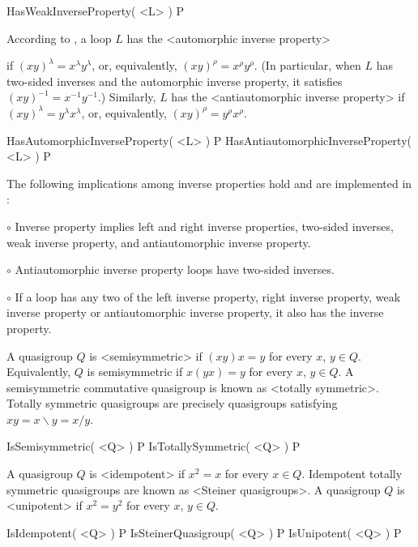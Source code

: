 \>HasWeakInverseProperty( <L> ) P

According to \cite{Ar}, a loop $L$ has the <automorphic inverse property>
%
%

if $(xy)^\lambda = x^\lambda y^\lambda$, or, equivalently, $(xy)^\rho = x^\rho
y^\rho$. (In particular, when $L$ has two-sided inverses and the automorphic
inverse property, it satisfies $(xy)^{-1}=x^{-1}y^{-1}$.) Similarly, $L$ has
the <antiautomorphic inverse property>
%
%
 if $(xy)^\lambda=y^\lambda
x^\lambda$, or, equivalently, $(xy)^\rho = y^\rho x^\rho$.

\>HasAutomorphicInverseProperty( <L> ) P
\>HasAntiautomorphicInverseProperty( <L> ) P

The following implications among inverse properties hold and are
implemented in {\LOOPS}:
\beginlist%
\item{$\circ$}
    Inverse property implies left and right inverse properties,
    two-sided inverses, weak inverse property, and antiautomorphic
    inverse property.
\item{$\circ$}
    Antiautomorphic inverse property loops have two-sided inverses.
\item{$\circ$}
    If a loop has any two of the left inverse property, right inverse property,
    weak inverse property or antiautomorphic inverse property, it also has
    the inverse property.
\endlist


A quasigroup $Q$ is <semisymmetric> if
$(xy)x=y$ for every $x$, $y\in Q$. Equivalently, $Q$ is semisymmetric if
$x(yx)=y$ for every $x$, $y\in Q$. A semisymmetric commutative quasigroup is
known as <totally symmetric>. Totally
symmetric quasigroups are precisely quasigroups satisfying $xy=x\backslash y =
x/y$.

\>IsSemisymmetric( <Q> ) P
\>IsTotallySymmetric( <Q> ) P

A quasigroup $Q$ is <idempotent> if $x^2=x$ for
every $x\in Q$. Idempotent totally symmetric quasigroups are known as <Steiner
quasigroups>. A quasigroup $Q$ is
<unipotent> if $x^2=y^2$ for every $x$, $y\in Q$.

\>IsIdempotent( <Q> ) P
\>IsSteinerQuasigroup( <Q> ) P
\>IsUnipotent( <Q> ) P

